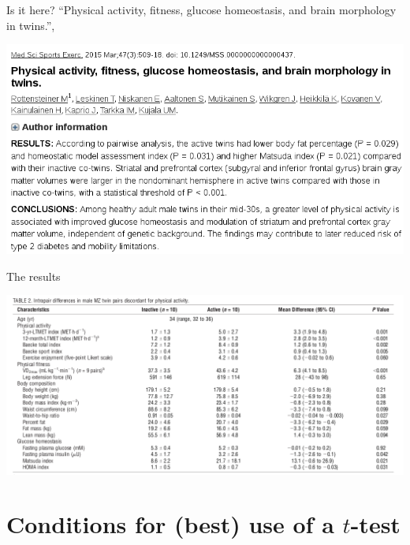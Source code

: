 %
\begin{frame}{Is it here?}
  {\small
  ``{Physical activity, fitness, glucose homeostasis, and brain morphology in twins.}'', 
  }
  \begin{center}
    \includegraphics[width=\textwidth]{examples/twins-exercise_abstract_results}
  \end{center}
  \flushright\small{}
\end{frame}

%
\begin{frame}[plain]{The results}
  \begin{center}
    \includegraphics[width=1.2\textwidth]{examples/twins-exercise_study-results}
  \end{center}
  \flushright\small{}
\end{frame}



\section{Conditions for (best) use of a $t$-test}

